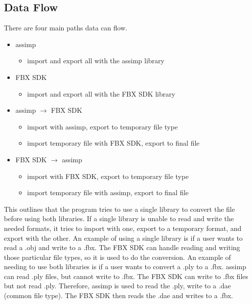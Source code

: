     \subsection{Data Flow}
        There are four main paths data can flow.
        \begin{itemize}
            \item assimp
            \begin{itemize}
                \item import and export all with the assimp library
            \end{itemize}
            
            \item FBX SDK
            \begin{itemize}
                \item import and export all with the FBX SDK library
            \end{itemize}

            \item assimp $\rightarrow$ FBX SDK
            \begin{itemize}
                \item import with assimp, export to temporary file type
                \item import temporary file with FBX SDK, export to final file 
            \end{itemize}

            \item FBX SDK $\rightarrow$ assimp
            \begin{itemize}
                \item import with FBX SDK, export to temporary file type
                \item import temporary file with assimp, export to final file 
            \end{itemize}
        \end{itemize}
        
        This outlines that the program tries to use a single library to convert the file before using both libraries.  If a single library is unable to 
        read and write the needed formats, it tries to import with one, export to a temporary format, and export with the other.  An example of 
        using a single library is if a user wants to read a .obj and write to a .fbx.  The FBX SDK can handle reading and writing those particular file
        types, so it is used to do the conversion.  An example of needing to use both libraries is if a user wants to convert a .ply to a .fbx.
        assimp can read .ply files, but cannot write to .fbx.  The FBX SDK can write to .fbx files but not read .ply.  Therefore, assimp is used to 
        read the .ply, write to a .dae (common file type).  The FBX SDK then reads the .dae and writes to a .fbx.

